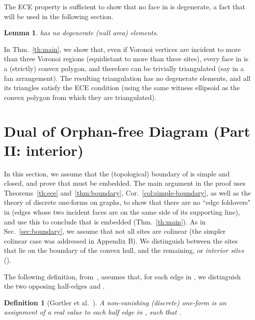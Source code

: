 \documentclass[11pt]{article}
\newtheorem{lemma}[theorem]{Lemma}
\newtheorem{definition}[theorem]{Definition}
\begin{document}
The ECE property is sufficient to show that no face in  is degenerate, a fact that will be used in the following section. 

\begin{lemma}\label{lem:degen}
	 has no degenerate (null area) elements. 
\end{lemma}




In Thm.~\ref{th:main}, we show that, even if Voronoi vertices are incident to more than three Voronoi regions (equidistant to more than three sites), every face in  is a (strictly) convex polygon, and therefore can be trivially triangulated (say in a fan arrangement). 
The resulting triangulation has no degenerate elements, and all its triangles satisfy the ECE condition (using the same witness ellipsoid as the convex polygon from which they are triangulated). 




\section{Dual of Orphan-free Diagram (Part II: interior)}\label{sec:interior}


In this section, we assume that the (topological) boundary of  is simple and closed, and prove that  must be embedded.
The main argument in the proof 
uses  Theorems~\ref{th:ece} and~\ref{thm:boundary}, Cor.~\ref{col:simple-boundary}, as well as 
the theory of discrete one-forms on graphs, 
to show that there are no
``edge foldovers" in  (edges whose two incident faces are on the same side of its supporting line), 
and use this to conclude that  is embedded (Thm.~\ref{th:main}). 
As in Sec.~\ref{sec:boundary}, we assume that not all sites are colinear 
(the simpler colinear case was addressed in Appendix B). We distinguish between the sites  that lie on the boundary of the convex hull, and the remaining, or
\emph{interior sites} (). 



The following definition, from~\cite{1form}, 
assumes that, for each edge
 in , we distinguish the two opposing half-edges
 and . 


\begin{definition}[Gortler et al.\ \cite{1form}]\label{def:1form}
A non-vanishing (discrete) one-form   is an assignment of a real value
 to each half edge  in , such that 
. 
\end{definition}
\end{document}
